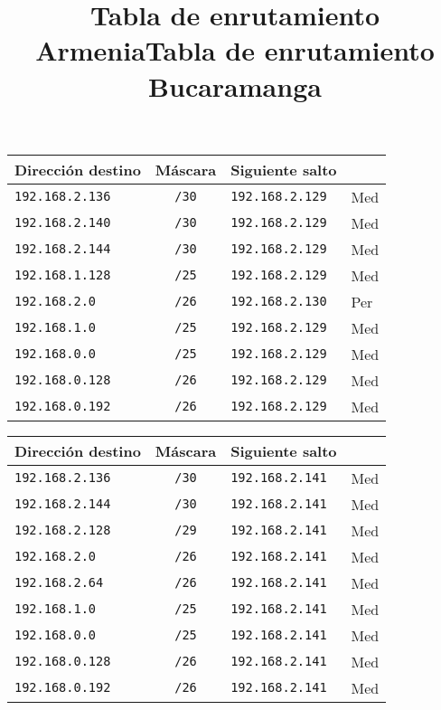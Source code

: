 \begin{table}[h]
\label{enrutamientoArm}
\begin{center}
\title{Tabla de enrutamiento Armenia} 
\begin{tabular}{lcll}
Dirección destino & Máscara & Siguiente salto &  \\ \hline
\verb=192.168.2.136= & \verb=/30= & \verb=192.168.2.129 = & Med \\
\verb=192.168.2.140= & \verb=/30= & \verb=192.168.2.129 = & Med \\
\verb=192.168.2.144= & \verb=/30= & \verb=192.168.2.129 = & Med \\
\verb=192.168.1.128= & \verb=/25= & \verb=192.168.2.129 = & Med \\
\verb=192.168.2.0= & \verb=/26= & \verb=192.168.2.130 = & Per \\
\verb=192.168.1.0= & \verb=/25= & \verb=192.168.2.129 = & Med \\
\verb=192.168.0.0= & \verb=/25= & \verb=192.168.2.129 = & Med \\
\verb=192.168.0.128= & \verb=/26= & \verb=192.168.2.129 = & Med \\
\verb=192.168.0.192= & \verb=/26= & \verb=192.168.2.129 = & Med \\
\end{tabular}
\end{center}
\end{table}%


\begin{table}[h]
\label{enrutamientoBuc}
\begin{center}
\title{Tabla de enrutamiento Bucaramanga}
\begin{tabular}{lcll}
Dirección destino & Máscara & Siguiente salto &  \\ \hline
\verb=192.168.2.136= & \verb=/30= & \verb=192.168.2.141 = & Med \\
\verb=192.168.2.144= & \verb=/30= & \verb=192.168.2.141 = & Med \\
\verb=192.168.2.128= & \verb=/29= & \verb=192.168.2.141 = & Med \\
\verb=192.168.2.0= & \verb=/26= & \verb=192.168.2.141 = & Med \\
\verb=192.168.2.64= & \verb=/26= & \verb=192.168.2.141 = & Med \\
\verb=192.168.1.0= & \verb=/25= & \verb=192.168.2.141 = & Med \\
\verb=192.168.0.0= & \verb=/25= & \verb=192.168.2.141 = & Med \\
\verb=192.168.0.128= & \verb=/26= & \verb=192.168.2.141 = & Med \\
\verb=192.168.0.192= & \verb=/26= & \verb=192.168.2.141 = & Med \\
\end{tabular}
\end{center}
\end{table}%


